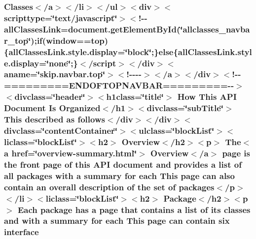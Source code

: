 \hypertarget{help-doc_8html_a86d37b4280c3ff6381b2eefd8660200d}{
\subsubsection[{interface}]{\setlength{\rightskip}{0pt plus 5cm}Classes$<$/{\bf a}$>$$<$/li$>$$<$/ul$>$$<$div$>$$<$scripttype=\char`\"{}text/javascript\char`\"{}$>$$<$!-\/-\/all\-Classes\-Link=document.\-get\-Element\-By\-Id(\char`\"{}allclasses\-\_\-navbar\-\_\-top\char`\"{});if(window==top)\{all\-Classes\-Link.\-style.\-display=\char`\"{}block\char`\"{};\}else\{all\-Classes\-Link.\-style.\-display=\char`\"{}none\char`\"{};\}$<$/script$>$$<$/div$>$$<$aname=\char`\"{}skip.\-navbar.\-top\char`\"{}$>$$<$!-\/-\/-\/-\/$>$$<$/a$>$$<$/div$>$$<$!-\/-\/=========E\-N\-D\-O\-F\-T\-O\-P\-N\-A\-V\-B\-A\-R=========-\/-\/$>$$<$divclass=\char`\"{}header\char`\"{}$>$$<$h1class=\char`\"{}title\char`\"{}$>$ How This {\bf A\-P\-I} Document Is Organized$<$/h1$>$$<$divclass=\char`\"{}sub\-Title\char`\"{}$>$ This described as follows$<$/div$>$$<$/div$>$$<$divclass=\char`\"{}content\-Container\char`\"{}$>$$<$ulclass=\char`\"{}block\-List\char`\"{}$>$$<$liclass=\char`\"{}block\-List\char`\"{}$>$$<$h2$>$ Overview$<$/h2$>$$<$p$>$ The$<${\bf a} href=\char`\"{}overview-\/summary.\-html\char`\"{}$>$ Overview$<$/{\bf a}$>$ page is the front page of this {\bf A\-P\-I} document and provides {\bf a} list of all packages with {\bf a} summary for each This page can also contain an overall {\bf description} of the set of packages$<$/p$>$$<$/li$>$$<$liclass=\char`\"{}block\-List\char`\"{}$>$$<$h2$>$ Package$<$/h2$>$$<$p$>$ Each package has {\bf a} page that contains {\bf a} list of its classes and with {\bf a} summary for each This page can contain six interface}}\label{help-doc_8html_a86d37b4280c3ff6381b2eefd8660200d}
